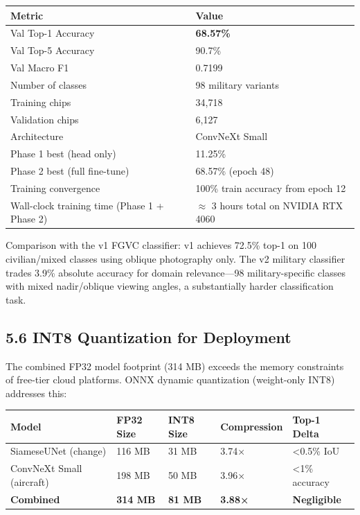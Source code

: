 \documentclass[11pt,a4paper]{article}
\begin{document}
\begin{longtable}[]{@{}ll@{}}
\toprule\noalign{}
Metric & Value \\
\midrule\noalign{}
\endhead
\bottomrule\noalign{}
\endlastfoot
Val Top-1 Accuracy & \textbf{68.57\%} \\
Val Top-5 Accuracy & 90.7\% \\
Val Macro F1 & 0.7199 \\
Number of classes & 98 military variants \\
Training chips & 34,718 \\
Validation chips & 6,127 \\
Architecture & ConvNeXt Small \\
Phase 1 best (head only) & 11.25\% \\
Phase 2 best (full fine-tune) & 68.57\% (epoch 48) \\
Training convergence & 100\% train accuracy from epoch 12 \\
Wall-clock training time (Phase 1 + Phase 2) & $\approx$ 3 hours total on NVIDIA RTX 4060 \\
\end{longtable}

Comparison with the v1 FGVC classifier: v1 achieves 72.5\% top-1 on 100 civilian/mixed classes using oblique photography only. The v2 military classifier trades 3.9\% absolute accuracy for domain relevance---98 military-specific classes with mixed nadir/oblique viewing angles, a substantially harder classification task.

\hypertarget{int8-quantization-for-deployment}{%
\subsection{5.6 INT8 Quantization for Deployment}\label{int8-quantization-for-deployment}}

The combined FP32 model footprint (314 MB) exceeds the memory constraints of free-tier cloud platforms. ONNX dynamic quantization (weight-only INT8) addresses this:

\begin{longtable}[]{@{}lllll@{}}
\toprule\noalign{}
Model & FP32 Size & INT8 Size & Compression & Top-1 Delta \\
\midrule\noalign{}
\endhead
\bottomrule\noalign{}
\endlastfoot
SiameseUNet (change) & 116 MB & 31 MB & 3.74× & \textless0.5\% IoU \\
ConvNeXt Small (aircraft) & 198 MB & 50 MB & 3.96× & \textless1\% accuracy \\
\textbf{Combined} & \textbf{314 MB} & \textbf{81 MB} & \textbf{3.88×} & \textbf{Negligible} \\
\end{longtable}
\end{document}
